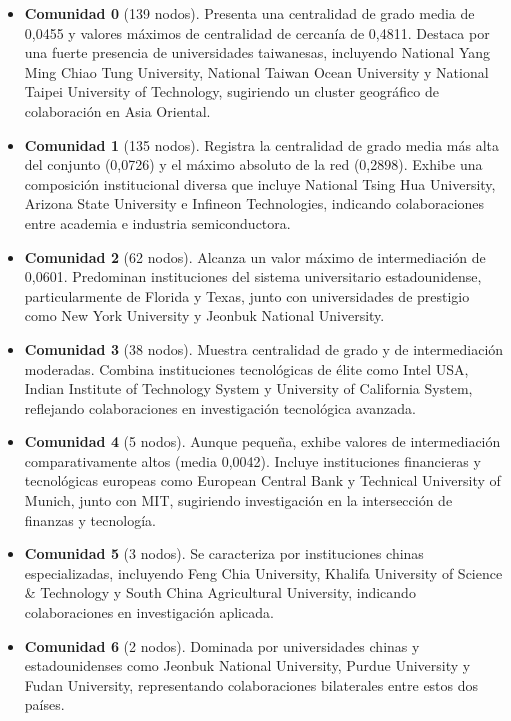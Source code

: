 \documentclass[twoside, twocolumn]{article}
\newcommand{\1}{\mathds{1}}						%
\begin{document}
\begin{itemize}
    \item \textbf{Comunidad 0} (139 nodos). Presenta una centralidad de grado media de 0,0455 y valores máximos de centralidad de cercanía de 0,4811. Destaca por una fuerte presencia de universidades taiwanesas, incluyendo National Yang Ming Chiao Tung University, National Taiwan Ocean University y National Taipei University of Technology, sugiriendo un cluster geográfico de colaboración en Asia Oriental.

    \item \textbf{Comunidad 1} (135 nodos). Registra la centralidad de grado media más alta del conjunto (0,0726) y el máximo absoluto de la red (0,2898). Exhibe una composición institucional diversa que incluye National Tsing Hua University, Arizona State University e Infineon Technologies, indicando colaboraciones entre academia e industria semiconductora.

    \item \textbf{Comunidad 2} (62 nodos). Alcanza un valor máximo de intermediación de 0,0601. Predominan instituciones del sistema universitario estadounidense, particularmente de Florida y Texas, junto con universidades de prestigio como New York University y Jeonbuk National University.

    \item \textbf{Comunidad 3} (38 nodos). Muestra centralidad de grado y de intermediación moderadas. Combina instituciones tecnológicas de élite como Intel USA, Indian Institute of Technology System y University of California System, reflejando colaboraciones en investigación tecnológica avanzada.

    \item \textbf{Comunidad 4} (5 nodos). Aunque pequeña, exhibe valores de intermediación comparativamente altos (media 0,0042). Incluye instituciones financieras y tecnológicas europeas como European Central Bank y Technical University of Munich, junto con MIT, sugiriendo investigación en la intersección de finanzas y tecnología.

    \item \textbf{Comunidad 5} (3 nodos). Se caracteriza por instituciones chinas especializadas, incluyendo Feng Chia University, Khalifa University of Science \& Technology y South China Agricultural University, indicando colaboraciones en investigación aplicada.

    \item \textbf{Comunidad 6} (2 nodos). Dominada por universidades chinas y estadounidenses como Jeonbuk National University, Purdue University y Fudan University, representando colaboraciones bilaterales entre estos dos países.
\end{itemize}
\end{document}
